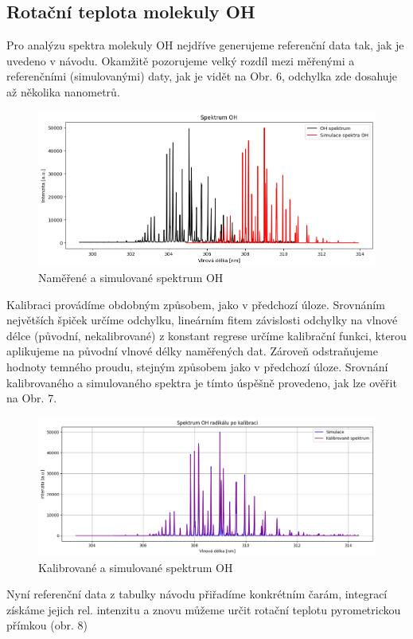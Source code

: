 \documentclass[czech,11pt,a4paper]{article}
\begin{document}
\begin{multicols}{2}
		\subsection{Rotační teplota molekuly OH}
		Pro analýzu spektra molekuly OH nejdříve generujeme referenční data tak, jak je uvedeno v návodu. Okamžitě pozorujeme velký rozdíl mezi měřenými a referenčními (simulovanými) daty, jak je vidět na Obr. 6, odchylka zde dosahuje až několika nanometrů.
		\begin{figure}[H]
			\centering
			\includegraphics[width=0.9\linewidth]{srovnani}
			\caption{Naměřené a simulované spektrum OH}			
		\end{figure}
		Kalibraci provádíme obdobným způsobem, jako v předchozí úloze. Srovnáním největších špiček určíme odchylku, lineárním fitem závislosti odchylky na vlnové délce (původní, nekalibrované) z konstant regrese určíme kalibrační funkci, kterou aplikujeme na původní vlnové délky naměřených dat. Zároveň odstraňujeme hodnoty temného proudu, stejným způsobem jako v předchozí úloze. Srovnání kalibrovaného a simulovaného spektra je tímto úspěšně provedeno, jak lze ověřit na Obr. 7.
		\begin{figure}[H]
			\centering
			\includegraphics[width=0.9\linewidth]{Spectrum4}
			\caption{Kalibrované a simulované spektrum OH}			
		\end{figure}
		Nyní referenční data z tabulky návodu přiřadíme konkrétním čarám, integrací získáme jejich rel. intenzitu a znovu můžeme určit rotační teplotu pyrometrickou přímkou (obr. 8)

\end{multicols}
\end{document}
